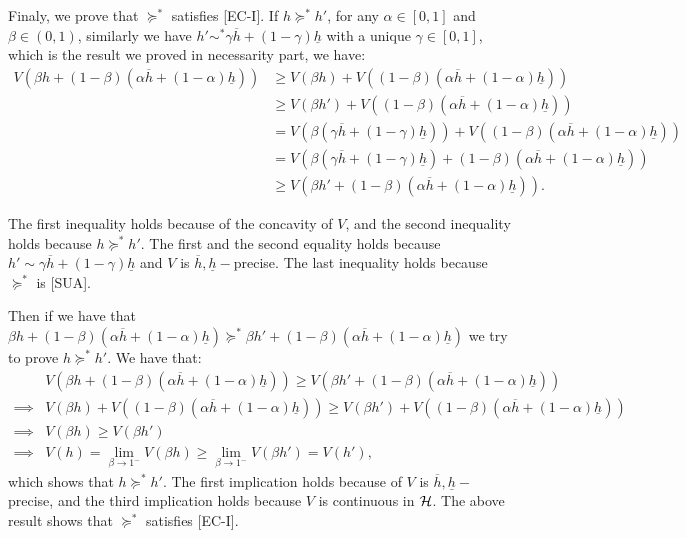 \documentclass[11pt,oneside]{article}
\theoremstyle{plain}
\theoremstyle{plain}
\theoremstyle{plain}
\theoremstyle{plain}
\theoremstyle{plain}
\theoremstyle{definition}
\theoremstyle{definition}
\theoremstyle{remark}
\theoremstyle{plain}
\newcommand{\ulh}{\underline{h}}
\newcommand{\olh}{\overline{h}}
\newcommand{\pfs}{\succeq^*}
\newcommand{\convexmix}[3]{#3 #1 + (1-#3) #2}
\begin{document}
Finaly, we prove that $\pfs$ satisfies [EC-I]. If $h \pfs h'$, for any $\alpha \in [0,1]$ and $\beta \in (0,1)$, similarly we have $h' \sim^* \convexmix{\olh}{\ulh}{\gamma}$ with a unique $\gamma \in [0,1]$, which is the result we proved in necessarity part,
we have:
\begin{align*}  
V\left(\convexmix{h}{\left(\convexmix{\olh}{\ulh}{\alpha}\right)}{\beta}\right) & \geq V(\beta h) +  V\left((1-\beta) \left(\convexmix{\olh}{\ulh}{\alpha}\right)\right) \\
& \geq V(\beta h') +  V\left((1-\beta) \left(\convexmix{\olh}{\ulh}{\alpha}\right)\right) \\
& = V\left(\beta \left(\convexmix{\olh}{\ulh}{\gamma}\right)\right) + V\left((1-\beta) \left(\convexmix{\olh}{\ulh}{\alpha}\right)\right)\\
& = V \left(\beta \left(\convexmix{\olh}{\ulh}{\gamma}\right) + (1-\beta) \left(\convexmix{\olh}{\ulh}{\alpha}\right)  \right) \\
& \geq V\left(\convexmix{h'}{\left(\convexmix{\olh}{\ulh}{\alpha}\right)}{\beta}\right).
\end{align*}

The first inequality holds because of the concavity of $V$, and the second inequality holds because $h \pfs h'$. The first and the second equality holds because 
$h' \sim \convexmix{\olh}{\ulh}{\gamma}$ and $V$ is $\olh,\ulh-$precise. The last inequality holds because $\pfs$ is [SUA].

Then if we have that $\convexmix{h}{\left(\convexmix{\olh}{\ulh}{\alpha}\right)}{\beta} \pfs \convexmix{h'}{\left(\convexmix{\olh}{\ulh}{\alpha}\right)}{\beta}$ we try to prove $h \pfs h'$.
We have that:
\begin{align*}
    & V \left( \convexmix{h}{\left(\convexmix{\olh}{\ulh}{\alpha}\right)}{\beta} \right) \geq V \left( \convexmix{h'}{\left(\convexmix{\olh}{\ulh}{\alpha}\right)}{\beta} \right) \\
    \implies & V(\beta h) + V\left((1-\beta)\left(\convexmix{\olh}{\ulh}{\alpha}\right)\right) \geq V(\beta h') + V\left((1-\beta)\left(\convexmix{\olh}{\ulh}{\alpha}\right)\right) \\ 
    \implies & V(\beta h) \geq V(\beta h')\\
    \implies & V(h) = \lim_{\beta \to 1^-} V(\beta h) \geq \lim_{\beta \to 1^-} V(\beta h') = V(h'),
\end{align*}
which shows that $h \pfs h'$. The first implication holds because of $V$ is $\olh,\ulh-$precise, and the third implication holds because $V$ is continuous in ${\cal H}$.
The above result shows that $\pfs$ satisfies [EC-I].
\end{document}
